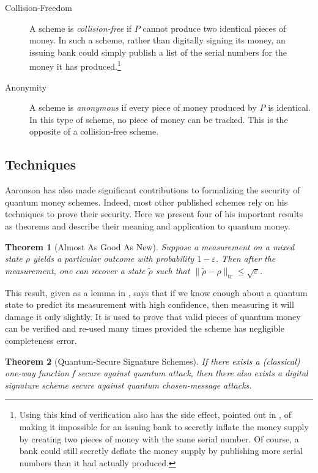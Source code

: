 \documentclass[12pt]{article}
\newtheorem{theorem}{Theorem}
\begin{document}
\begin{description}
\item[Collision-Freedom] A scheme is \emph{collision-free} if $P$ cannot produce two identical pieces of money.  In such a scheme, rather than digitally signing its money, an issuing bank could simply publish a list of the serial numbers for the money it has produced.\footnote{Using this kind of verification also has the side effect, pointed out in \cite{Lut09}, of making it impossible for an issuing bank to secretly inflate the money supply by creating two pieces of money with the same serial number.  Of course, a bank could still secretly deflate the money supply by publishing more serial numbers than it had actually produced.}
\item[Anonymity] A scheme is \emph{anonymous} if every piece of money produced by $P$ is identical.  In this type of scheme, no piece of money can be tracked.  This is the opposite of a collision-free scheme.
\end{description}

\subsection{Techniques}
Aaronson has also made significant contributions to formalizing the security of quantum money schemes.  Indeed, most other published schemes rely on his techniques to prove their security.  Here we present four of his important results as theorems and describe their meaning and application to quantum money.

\begin{theorem}[Almost As Good As New]
Suppose a measurement on a mixed state $\rho$ yields a particular outcome with probability $1 - \varepsilon$.  Then after the measurement, one can recover a state $\tilde{\rho}$ such that $\|\tilde{\rho} - \rho\|_\mathrm{tr} \leq \sqrt{\varepsilon}$.
\end{theorem}

This result, given as a lemma in \cite{Aar05}, says that if we know enough about a quantum state to predict its measurement with high confidence, then measuring it will damage it only slightly.  It is used to prove that valid pieces of quantum money can be verified and re-used many times provided the scheme has negligible completeness error.

\begin{theorem}[Quantum-Secure Signature Schemes]
If there exists a (classical) one-way function f secure against quantum attack, then there also exists a digital signature scheme secure against quantum chosen-message attacks.
\end{theorem}
\end{document}
